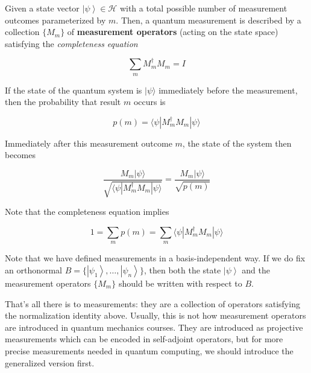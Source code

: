 \documentclass{article}
\newcommand{\ket}[1]{\ensuremath{\left|#1\right\rangle}}
\begin{document}
      \begin{theorem}
        Given a state vector $\ket{\psi} \in \mathcal{H}$ with a total possible number of measurement outcomes parameterized by $m$. Then, a quantum measurement is described by a collection $\{M_m\}$ of \textbf{measurement operators} (acting on the state space) satisfying the \textit{completeness equation}

          \[\sum_{m} M_m^\dagger M_m = I\]

        If the state of the quantum system is $|\psi \rangle$ immediately before the measurement, then the probability that result $m$ occurs is

          \[p(m) = \langle \psi | M_m^\dagger M_m | \psi \rangle\]

        Immediately after this measurement outcome $m$, the state of the system then becomes

          \[\frac{M_m |\psi \rangle}{\sqrt{\langle \psi| M_m^\dagger M_m |\psi \rangle}} = \frac{M_m |\psi \rangle}{\sqrt{p(m)}}\]

        Note that the completeness equation implies

          \[1 = \sum_m p(m) = \sum_m \langle \psi | M_m^\dagger M_m | \psi \rangle\]

        Note that we have defined measurements in a basis-independent way. If we do fix an orthonormal $B = \{ \ket{\psi_1}, \ldots, \ket{\psi_n}\}$, then both the state $\ket{\psi}$ and the measurement operators $\{M_m\}$ should be written with respect to $B$. 
      \end{theorem}

      That's all there is to measurements: they are a collection of operators satisfying the normalization identity above. Usually, this is not how measurement operators are introduced in quantum mechanics courses. They are introduced as projective measurements which can be encoded in self-adjoint operators, but for more precise measurements needed in quantum computing, we should introduce the generalized version first. 
\end{document}
